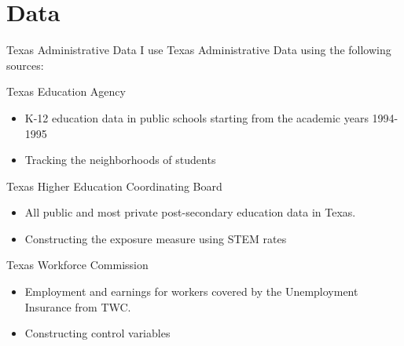 \documentclass[aspectratio=169,xcolor=dvipsnames]{beamer}
\newenvironment{wideitemize}{\itemize\addtolength{\itemsep}{10pt}}{\enditemize}
\begin{document}

\section{Data}
\begin{frame}{Texas Administrative Data}
I use Texas Administrative Data using the following sources:
\begin{wideitemize}
\item Texas Education Agency
\begin{itemize}
    \item K-12 education data in public schools starting from the academic years 1994-1995 
    \item Tracking the neighborhoods of students
\end{itemize}
\item Texas Higher Education Coordinating Board 
\begin{itemize}
    \item All public and most private post-secondary education data in Texas.
    \item Constructing the exposure measure using STEM rates
\end{itemize}
\item Texas Workforce Commission
\begin{itemize}
    \item Employment and earnings for workers covered by the Unemployment Insurance from TWC. 
    \item Constructing control variables
\end{itemize}
    \end{wideitemize}
\end{frame}
\end{document}
